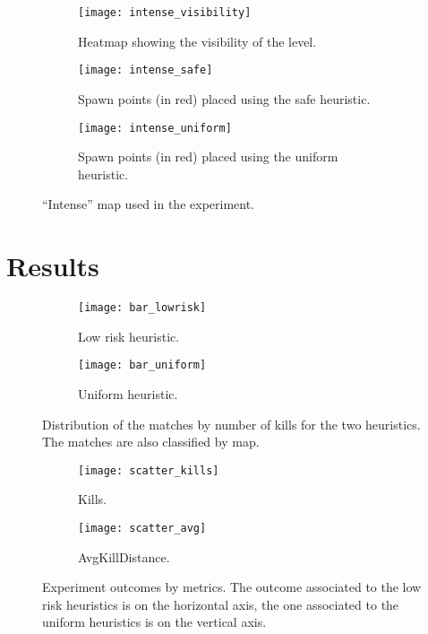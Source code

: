 \begin{figure}[tp]
	\centering  	
  	\begin{subfigure}[t]{0.3\linewidth}
    		\texttt{[image: intense\_visibility]}
     		\caption{Heatmap showing the visibility of the level.}
		\label{img:intense_visibility}
  	\end{subfigure}  	
  	\hfil
  	\begin{subfigure}[t]{0.3\linewidth}
    		\texttt{[image: intense\_safe]}
     		\caption{Spawn points (in red) placed using the safe heuristic.}
     		\label{img:intense_safe}
  	\end{subfigure}
  	\hfil
  	\begin{subfigure}[t]{0.3\linewidth}
    		\texttt{[image: intense\_uniform]}
     		\caption{Spawn points (in red) placed using the uniform heuristic.}
		\label{img:intense_uniform}
  	\end{subfigure}
	\caption{``Intense'' map used in the experiment.}
	\label{img:intense}	
\end{figure}


\section{Results}

\begin{figure}[tp]
 	\centering
  	\begin{subfigure}[t]{0.8\linewidth}
    		\texttt{[image: bar\_lowrisk]}
     		\caption{Low risk heuristic.}
		\label{img:bar_lowrisk}
  	\end{subfigure}  	
  	\begin{subfigure}[t]{0.8\linewidth}
    		\texttt{[image: bar\_uniform]}
     		\caption{Uniform heuristic.}
     		\label{img:bar_uniform}
  	\end{subfigure}
	\caption[Distribution of the matches by number of kills for the two heuristics.]{Distribution of the matches by number of kills for the two heuristics. The matches are also classified by map.}
	\label{img:match_distribution}	
\end{figure}

\begin{figure}[tp]
 	\centering
  	\begin{subfigure}[t]{0.48\linewidth}
    		\texttt{[image: scatter\_kills]}
     		\caption{Kills.}
		\label{img:bar_lowrisk}
  	\end{subfigure}
  	\hfill
  	\begin{subfigure}[t]{0.48\linewidth}
    		\texttt{[image: scatter\_avg]}
     		\caption{AvgKillDistance.}
     		\label{img:bar_uniform}
  	\end{subfigure}
	\caption[Experiment outcomes by metrics.]{Experiment outcomes by metrics. The outcome associated to the low risk heuristics is on the horizontal axis, the one associated to the uniform heuristics is on the vertical axis.}
	\label{img:metrics}	
\end{figure}

